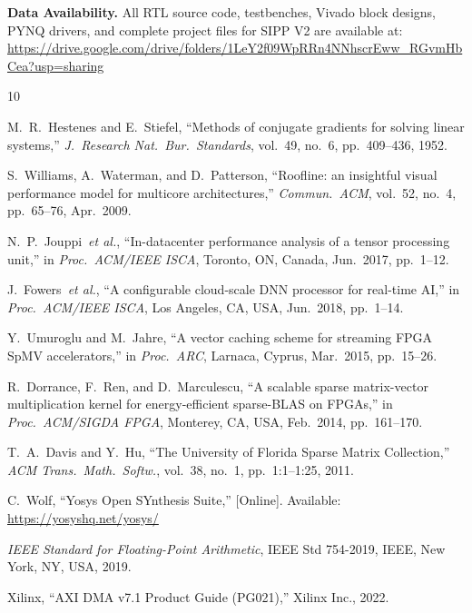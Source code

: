 \documentclass[journal,a4paper]{IEEEtran}
\begin{document}
\textbf{Data Availability.}
All RTL source code, testbenches, Vivado block designs, PYNQ drivers,
and complete project files for SIPP V2 are available at: \\
\url{https://drive.google.com/drive/folders/1LeY2f09WpRRn4NNhscrEww_RGvmHbCea?usp=sharing}

\begin{thebibliography}{10}

M.~R.~Hestenes and E.~Stiefel,
``Methods of conjugate gradients for solving linear systems,''
\emph{J.\ Research Nat.\ Bur.\ Standards}, vol.~49, no.~6,
pp.~409--436, 1952.

S.~Williams, A.~Waterman, and D.~Patterson,
``Roofline: an insightful visual performance model for multicore architectures,''
\emph{Commun.\ ACM}, vol.~52, no.~4, pp.~65--76, Apr.~2009.

N.~P.~Jouppi~\textit{et al.},
``In-datacenter performance analysis of a tensor processing unit,''
in \emph{Proc.\ ACM/IEEE ISCA}, Toronto, ON, Canada, Jun.~2017, pp.~1--12.

J.~Fowers~\textit{et al.},
``A configurable cloud-scale DNN processor for real-time AI,''
in \emph{Proc.\ ACM/IEEE ISCA}, Los Angeles, CA, USA, Jun.~2018, pp.~1--14.

Y.~Umuroglu and M.~Jahre,
``A vector caching scheme for streaming FPGA SpMV accelerators,''
in \emph{Proc.\ ARC}, Larnaca, Cyprus, Mar.~2015, pp.~15--26.

R.~Dorrance, F.~Ren, and D.~Marculescu,
``A scalable sparse matrix-vector multiplication kernel for
energy-efficient sparse-BLAS on FPGAs,''
in \emph{Proc.\ ACM/SIGDA FPGA}, Monterey, CA, USA, Feb.~2014,
pp.~161--170.

T.~A.~Davis and Y.~Hu,
``The University of Florida Sparse Matrix Collection,''
\emph{ACM Trans.\ Math.\ Softw.}, vol.~38, no.~1, pp.~1:1--1:25, 2011.

C.~Wolf,
``Yosys Open SYnthesis Suite,''
[Online]. Available: \url{https://yosyshq.net/yosys/}

\emph{IEEE Standard for Floating-Point Arithmetic},
IEEE Std 754-2019, IEEE, New York, NY, USA, 2019.

Xilinx,
``AXI DMA v7.1 Product Guide (PG021),''
Xilinx Inc., 2022.

\end{thebibliography}
\end{document}
